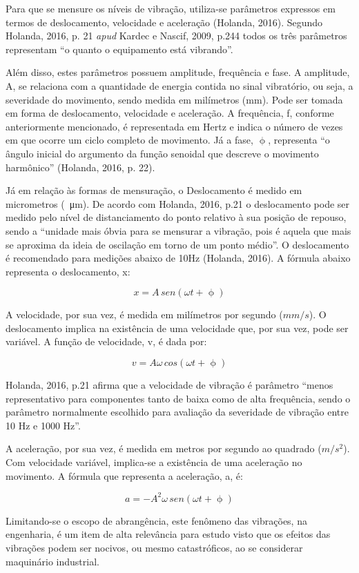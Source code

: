 \documentclass[
	12pt,				
	oneside,			
	a4paper,			
	english,			
	brazil				
	]{abntex2ppgsi}
\begin{document}
Para que se mensure os níveis de vibração, utiliza-se parâmetros expressos em termos de deslocamento, velocidade e aceleração (Holanda, 2016). Segundo Holanda, 2016, p. 21 \textit{apud} Kardec e Nascif, 2009, p.244 todos os três parâmetros representam “o quanto o equipamento está vibrando”. 

Além disso, estes parâmetros possuem amplitude, frequência e fase. A amplitude, A, se relaciona com a quantidade de energia contida no sinal vibratório, ou seja, a severidade do movimento, sendo medida em milímetros (mm). Pode ser tomada em forma de deslocamento, velocidade e aceleração. A frequência, f, conforme anteriormente mencionado, é representada em Hertz e indica o número de vezes em que ocorre um ciclo completo de movimento. Já a fase, $\upphi$, representa “o ângulo inicial do argumento da função senoidal que descreve o movimento harmônico” (Holanda, 2016, p. 22).

Já em relação às formas de mensuração, o Deslocamento é medido em micrometros (\SI{}{\micro\metre}). De acordo com Holanda, 2016, p.21 o deslocamento pode ser medido pelo nível de distanciamento do ponto relativo à sua posição de repouso, sendo a “unidade mais óbvia para se mensurar a vibração, pois é aquela que mais se aproxima da ideia de oscilação em torno de um ponto médio”. O deslocamento é recomendado para medições abaixo de 10Hz (Holanda, 2016). A fórmula abaixo representa o deslocamento, x:

\[x = A \,sen (\omega t + \upphi)\]

A velocidade, por sua vez, é medida em milímetros por segundo ($mm/s$). O deslocamento implica na existência de uma velocidade que, por sua vez, pode ser variável. A função de velocidade, v, é dada por:

\[v = A\omega \,cos (\omega t + \upphi)\]

Holanda, 2016, p.21 afirma que a velocidade de vibração é parâmetro “menos representativo para componentes tanto de baixa como de alta frequência, sendo o parâmetro normalmente escolhido para avaliação da severidade de vibração entre 10 Hz e 1000 Hz”.

A aceleração, por sua vez, é medida em metros por segundo ao quadrado ($m/s^{2}$). Com velocidade variável, implica-se a existência de uma aceleração no movimento. A fórmula que representa a aceleração, a, é:

\[a = -A^{2} \omega \,sen (\omega t + \upphi)\]

Limitando-se o escopo de abrangência, este fenômeno das vibrações, na engenharia, é um item de alta relevância para estudo visto que os efeitos das vibrações podem ser nocivos, ou mesmo catastróficos, ao se considerar maquinário industrial. 
\end{document}
